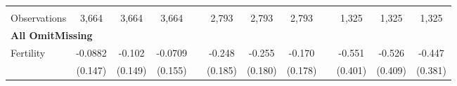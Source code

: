 \begin{landscape}
\begin{table}[htpb!]
\begin{center}
\begin{tabular}{lcccp{2mm}cccp{2mm}ccc}
\begin{footnotesize}\end{footnotesize}&\begin{footnotesize}\end{footnotesize}&\begin{footnotesize}\end{footnotesize}&\begin{footnotesize}\end{footnotesize}&\begin{footnotesize}\end{footnotesize}&\begin{footnotesize}\end{footnotesize}&\begin{footnotesize}\end{footnotesize}&\begin{footnotesize}\end{footnotesize}&\begin{footnotesize}\end{footnotesize}&\begin{footnotesize}\end{footnotesize}&\begin{footnotesize}\end{footnotesize}&\begin{footnotesize}\end{footnotesize}\\Observations&3,664&3,664&3,664&&2,793&2,793&2,793&&1,325&1,325&1,325\\
\multicolumn{12}{l}{\textbf{All OmitMissing}}\\ 
Fertility&-0.0882&-0.102&-0.0709&&-0.248&-0.255&-0.170&&-0.551&-0.526&-0.447\\
&(0.147)&(0.149)&(0.155)&&(0.185)&(0.180)&(0.178)&&(0.401)&(0.409)&(0.381)\\

\end{tabular}
\end{center}
\end{table}
\end{landscape}
